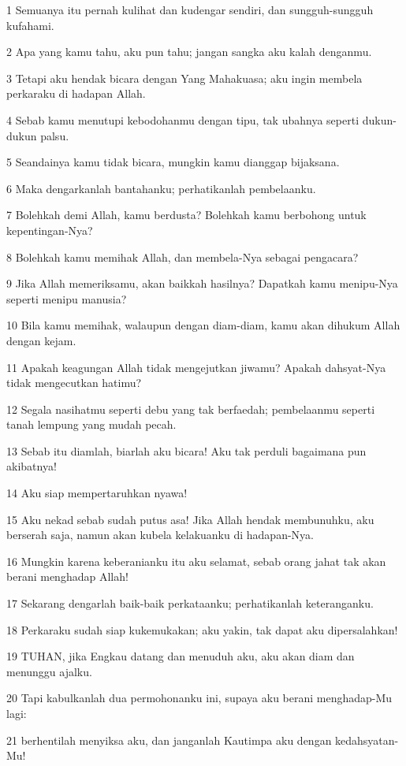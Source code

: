 \par 1 Semuanya itu pernah kulihat dan kudengar sendiri, dan sungguh-sungguh kufahami.
\par 2 Apa yang kamu tahu, aku pun tahu; jangan sangka aku kalah denganmu.
\par 3 Tetapi aku hendak bicara dengan Yang Mahakuasa; aku ingin membela perkaraku di hadapan Allah.
\par 4 Sebab kamu menutupi kebodohanmu dengan tipu, tak ubahnya seperti dukun-dukun palsu.
\par 5 Seandainya kamu tidak bicara, mungkin kamu dianggap bijaksana.
\par 6 Maka dengarkanlah bantahanku; perhatikanlah pembelaanku.
\par 7 Bolehkah demi Allah, kamu berdusta? Bolehkah kamu berbohong untuk kepentingan-Nya?
\par 8 Bolehkah kamu memihak Allah, dan membela-Nya sebagai pengacara?
\par 9 Jika Allah memeriksamu, akan baikkah hasilnya? Dapatkah kamu menipu-Nya seperti menipu manusia?
\par 10 Bila kamu memihak, walaupun dengan diam-diam, kamu akan dihukum Allah dengan kejam.
\par 11 Apakah keagungan Allah tidak mengejutkan jiwamu? Apakah dahsyat-Nya tidak mengecutkan hatimu?
\par 12 Segala nasihatmu seperti debu yang tak berfaedah; pembelaanmu seperti tanah lempung yang mudah pecah.
\par 13 Sebab itu diamlah, biarlah aku bicara! Aku tak perduli bagaimana pun akibatnya!
\par 14 Aku siap mempertaruhkan nyawa!
\par 15 Aku nekad sebab sudah putus asa! Jika Allah hendak membunuhku, aku berserah saja, namun akan kubela kelakuanku di hadapan-Nya.
\par 16 Mungkin karena keberanianku itu aku selamat, sebab orang jahat tak akan berani menghadap Allah!
\par 17 Sekarang dengarlah baik-baik perkataanku; perhatikanlah keteranganku.
\par 18 Perkaraku sudah siap kukemukakan; aku yakin, tak dapat aku dipersalahkan!
\par 19 TUHAN, jika Engkau datang dan menuduh aku, aku akan diam dan menunggu ajalku.
\par 20 Tapi kabulkanlah dua permohonanku ini, supaya aku berani menghadap-Mu lagi:
\par 21 berhentilah menyiksa aku, dan janganlah Kautimpa aku dengan kedahsyatan-Mu!
